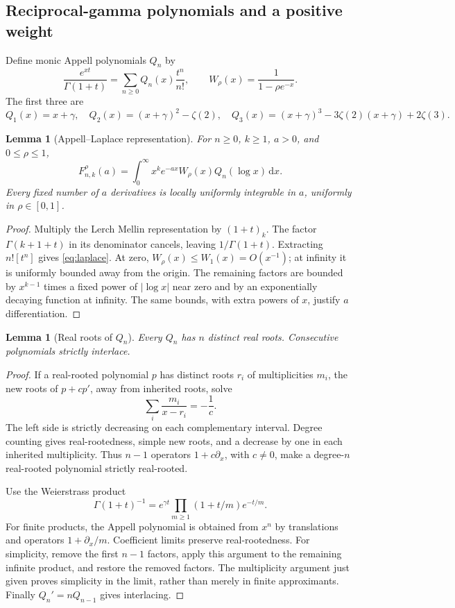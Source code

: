 \documentclass[11pt]{article}
\numberwithin{equation}{section}
\newtheorem{lemma}[theorem]{Lemma}
\theoremstyle{definition}\newtheorem{definition}[theorem]{Definition}
\theoremstyle{remark}\newtheorem{remark}[theorem]{Remark}
\newcommand{\dd}{\,\mathrm d}
\begin{document}
\subsection{Reciprocal-gamma polynomials and a positive weight}
Define monic Appell polynomials $Q_n$ by
\begin{equation}\label{eq:Qgen}
\frac{e^{xt}}{\Gamma(1+t)}=\sum_{n\geq0}Q_n(x)\frac{t^n}{n!},
\qquad W_\rho(x)=\frac1{1-\rho e^{-x}}.
\end{equation}
The first three are
\[
Q_1(x)=x+\gamma,\quad
Q_2(x)=(x+\gamma)^2-\zeta(2),\quad
Q_3(x)=(x+\gamma)^3-3\zeta(2)(x+\gamma)+2\zeta(3).
\]

\begin{lemma}[Appell--Laplace representation]\label{lem:laplace}
For $n\geq0$, $k\geq1$, $a>0$, and $0\leq\rho\leq1$,
\begin{equation}\label{eq:laplace}
F_{n,k}^{\rho}(a)=\int_0^\infty x^k e^{-ax}W_\rho(x)Q_n(\log x)\dd x.
\end{equation}
Every fixed number of $a$ derivatives is locally uniformly integrable in $a$, uniformly in $\rho\in[0,1]$.
\end{lemma}
\begin{proof}
Multiply the Lerch Mellin representation \cite{dlmflerch} by $(1+t)_k$. The factor $\Gamma(k+1+t)$ in its denominator cancels, leaving $1/\Gamma(1+t)$. Extracting $n![t^n]$ gives \eqref{eq:laplace}. At zero, $W_\rho(x)\leq W_1(x)=O(x^{-1})$; at infinity it is uniformly bounded away from the origin. The remaining factors are bounded by $x^{k-1}$ times a fixed power of $|\log x|$ near zero and by an exponentially decaying function at infinity. The same bounds, with extra powers of $x$, justify $a$ differentiation.
\end{proof}

\begin{lemma}[Real roots of $Q_n$]\label{lem:Qroots}
Every $Q_n$ has $n$ distinct real roots. Consecutive polynomials strictly interlace.
\end{lemma}
\begin{proof}
If a real-rooted polynomial $p$ has distinct roots $r_i$ of multiplicities $m_i$, the new roots of $p+cp'$, away from inherited roots, solve
\[
\sum_i\frac{m_i}{x-r_i}=-\frac1c.
\]
The left side is strictly decreasing on each complementary interval. Degree counting gives real-rootedness, simple new roots, and a decrease by one in each inherited multiplicity. Thus $n-1$ operators $1+c\partial_x$, with $c\ne0$, make a degree-$n$ real-rooted polynomial strictly real-rooted.

Use the Weierstrass product
\[
\Gamma(1+t)^{-1}=e^{\gamma t}\prod_{m\geq1}(1+t/m)e^{-t/m}.
\]
For finite products, the Appell polynomial is obtained from $x^n$ by translations and operators $1+\partial_x/m$. Coefficient limits preserve real-rootedness. For simplicity, remove the first $n-1$ factors, apply this argument to the remaining infinite product, and restore the removed factors. The multiplicity argument just given proves simplicity in the limit, rather than merely in finite approximants. Finally $Q_n'=nQ_{n-1}$ gives interlacing.
\end{proof}
\end{document}
